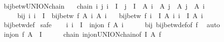 \begin{isabellebody}
\isamarkupfalse%
%
\endisatagproof
{\isafoldproof}%
%
\isadelimproof
\isanewline
%
\endisadelimproof
\isanewline
{}\isamarkupfalse%
\ bij{\isacharunderscore}{\kern0pt}betw{\isacharunderscore}{\kern0pt}UNION{\isacharunderscore}{\kern0pt}chain{\isacharcolon}{\kern0pt}\isanewline
\ \ \ chain{\isacharcolon}{\kern0pt}\ {\isachardoublequoteopen}{\isasymAnd}i\ j{\isachardot}{\kern0pt}\ i\ {\isasymin}\ I\ {\isasymLongrightarrow}\ j\ {\isasymin}\ I\ {\isasymLongrightarrow}\ A\ i\ {\isasymle}\ A\ j\ {\isasymor}\ A\ j\ {\isasymle}\ A\ i{\isachardoublequoteclose}\isanewline
\ \ \ \ \ bij{\isacharcolon}{\kern0pt}\ {\isachardoublequoteopen}{\isasymAnd}i{\isachardot}{\kern0pt}\ i\ {\isasymin}\ I\ {\isasymLongrightarrow}\ bij{\isacharunderscore}{\kern0pt}betw\ f\ {\isacharparenleft}{\kern0pt}A\ i{\isacharparenright}{\kern0pt}\ {\isacharparenleft}{\kern0pt}A{\isacharprime}{\kern0pt}\ i{\isacharparenright}{\kern0pt}{\isachardoublequoteclose}\isanewline
\ \ \ {\isachardoublequoteopen}bij{\isacharunderscore}{\kern0pt}betw\ f\ {\isacharparenleft}{\kern0pt}{\isasymUnion}i\ {\isasymin}\ I{\isachardot}{\kern0pt}\ A\ i{\isacharparenright}{\kern0pt}\ {\isacharparenleft}{\kern0pt}{\isasymUnion}i\ {\isasymin}\ I{\isachardot}{\kern0pt}\ A{\isacharprime}{\kern0pt}\ i{\isacharparenright}{\kern0pt}{\isachardoublequoteclose}\isanewline
%
\isadelimproof
\ \ %
\endisadelimproof
%
\isatagproof
{}\isamarkupfalse%
\ bij{\isacharunderscore}{\kern0pt}betw{\isacharunderscore}{\kern0pt}def\isanewline
{}\isamarkupfalse%
\ safe\isanewline
\ \ \isamarkupfalse%
\ {\isachardoublequoteopen}{\isasymAnd}i{\isachardot}{\kern0pt}\ i\ {\isasymin}\ I\ {\isasymLongrightarrow}\ inj{\isacharunderscore}{\kern0pt}on\ f\ {\isacharparenleft}{\kern0pt}A\ i{\isacharparenright}{\kern0pt}{\isachardoublequoteclose}\isanewline
\ \ \ \ \isamarkupfalse%
\ bij\ bij{\isacharunderscore}{\kern0pt}betw{\isacharunderscore}{\kern0pt}def{\isacharbrackleft}{\kern0pt}of\ f{\isacharbrackright}{\kern0pt}\ \isamarkupfalse%
\ auto\isanewline
\ \ \isamarkupfalse%
\ \isamarkupfalse%
\ {\isachardoublequoteopen}inj{\isacharunderscore}{\kern0pt}on\ f\ {\isacharparenleft}{\kern0pt}{\isasymUnion}{\isacharparenleft}{\kern0pt}A\ {\isacharbackquote}{\kern0pt}\ I{\isacharparenright}{\kern0pt}{\isacharparenright}{\kern0pt}{\isachardoublequoteclose}\isanewline
\ \ \ \ \isamarkupfalse%
\ chain\ inj{\isacharunderscore}{\kern0pt}on{\isacharunderscore}{\kern0pt}UNION{\isacharunderscore}{\kern0pt}chain{\isacharbrackleft}{\kern0pt}of\ I\ A\ f{\isacharbrackright}{\kern0pt}\ \isamarkupfalse%

\end{isabellebody}
